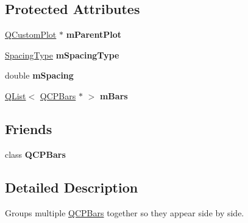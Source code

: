 \subsection*{Protected Attributes}
\begin{DoxyCompactItemize}
\item 
\mbox{\label{class_q_c_p_bars_group_a32ae4b78f87bd225a604e73a4ae9be83}} 
\hyperlink{class_q_custom_plot}{Q\+Custom\+Plot} $\ast$ {\bfseries m\+Parent\+Plot}
\item 
\mbox{\label{class_q_c_p_bars_group_a6794ee1a9c81864d627bff6a4b2d64ec}} 
\hyperlink{class_q_c_p_bars_group_a4c0521120a97e60bbca37677a37075b6}{Spacing\+Type} {\bfseries m\+Spacing\+Type}
\item 
\mbox{\label{class_q_c_p_bars_group_a56471d7f548ca6141b7a5bf9629f7ece}} 
double {\bfseries m\+Spacing}
\item 
\mbox{\label{class_q_c_p_bars_group_afdf50d0fcb5322b9fcf51c39660c066e}} 
\hyperlink{class_q_list}{Q\+List}$<$ \hyperlink{class_q_c_p_bars}{Q\+C\+P\+Bars} $\ast$ $>$ {\bfseries m\+Bars}
\end{DoxyCompactItemize}
\subsection*{Friends}
\begin{DoxyCompactItemize}
\item 
\mbox{\label{class_q_c_p_bars_group_ad54ecefadd1efdfcaca605dba1fcc7c2}} 
class {\bfseries Q\+C\+P\+Bars}
\end{DoxyCompactItemize}


\subsection{Detailed Description}
Groups multiple \hyperlink{class_q_c_p_bars}{Q\+C\+P\+Bars} together so they appear side by side. 



